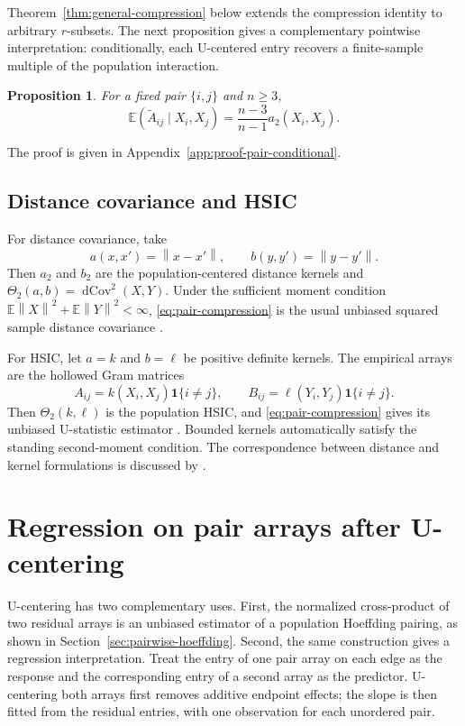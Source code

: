 \documentclass[11pt]{article}
\theoremstyle{plain}
\newtheorem{proposition}[theorem]{Proposition}
\theoremstyle{definition}
\theoremstyle{remark}
\newcommand{\E}{\mathbb E}
\newcommand{\norm}[1]{\left\lVert #1\right\rVert}
\begin{document}
Theorem~\ref{thm:general-compression} below extends the compression identity to
arbitrary $r$-subsets.  The next proposition gives a complementary pointwise
interpretation: conditionally, each U-centered entry recovers a finite-sample
multiple of the population interaction.

\begin{proposition}
\label{prop:pair-conditional}
For a fixed pair $\{i,j\}$ and $n\ge3$,
\begin{equation}\label{eq:pair-conditional}
 \E\left(\widetilde A_{ij}\mid X_i,X_j\right)
 =\frac{n-3}{n-1}a_2(X_i,X_j).
\end{equation}
\end{proposition}

\noindent The proof is given in
Appendix~\ref{app:proof-pair-conditional}.

\subsection{Distance covariance and HSIC}

For distance covariance, take
\[
 a(x,x')=\norm{x-x'},\qquad b(y,y')=\norm{y-y'}.
\]
Then $a_2$ and $b_2$ are the population-centered distance kernels and
$\Theta_2(a,b)=\operatorname{dCov}^2(X,Y)$.  Under the sufficient moment
condition $\E\norm X^2+\E\norm Y^2<\infty$,
\eqref{eq:pair-compression} is the usual unbiased squared sample distance
covariance \citep{SzekelyRizzoBakirov2007,SzekelyRizzo2014}.

For HSIC, let $a=k$ and $b=\ell$ be positive definite kernels.  The empirical
arrays are the hollowed Gram matrices
\[
 A_{ij}=k(X_i,X_j)\mathbf 1\{i\ne j\},\qquad
 B_{ij}=\ell(Y_i,Y_j)\mathbf 1\{i\ne j\}.
\]
Then $\Theta_2(k,\ell)$ is the population HSIC, and
\eqref{eq:pair-compression} gives its unbiased U-statistic estimator
\citep{GrettonEtAl2008,SongEtAl2012}.  Bounded kernels automatically satisfy
the standing second-moment condition.  The correspondence between distance
and kernel formulations is discussed by \citet{SejdinovicEtAl2013}.


\section{Regression on pair arrays after U-centering}
\label{sec:edge-regression}

U-centering has two complementary uses.  First, the normalized cross-product
of two residual arrays is an unbiased estimator of a population Hoeffding
pairing, as shown in Section~\ref{sec:pairwise-hoeffding}.  Second, the
same construction gives a regression interpretation.  Treat the entry of one
pair array on each edge as the response and the corresponding entry of a
second array as the predictor.  U-centering both arrays first removes additive
endpoint effects; the slope is then fitted from the residual entries, with one
observation for each unordered pair.
\end{document}
